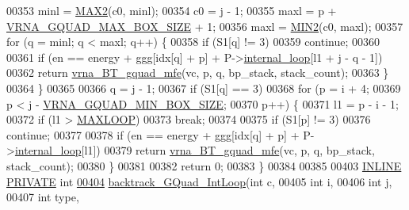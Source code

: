 \begin{DoxyCode}
00353     minl  = \mbox{\hyperlink{group__utils_ga33297b3679c713b0c4d897cd0fe3b122}{MAX2}}(c0, minl);
00354     c0    = j - 1;
00355     maxl  = p + \mbox{\hyperlink{group__energy__parameters_ga56cafabad2f8a7db83f2d5d3b0e8d313}{VRNA\_GQUAD\_MAX\_BOX\_SIZE}} + 1;
00356     maxl  = \mbox{\hyperlink{group__utils_gae0b9cd0ce090bd69b951aa73e8fa4f7d}{MIN2}}(c0, maxl);
00357     \textcolor{keywordflow}{for} (q = minl; q < maxl; q++) \{
00358       \textcolor{keywordflow}{if} (S1[q] != 3)
00359         \textcolor{keywordflow}{continue};
00360 
00361       \textcolor{keywordflow}{if} (en == energy + ggg[idx[q] + p] + P->\mbox{\hyperlink{group__energy__parameters_a2a4fb2c65023ec371c9b96573da6d2fc}{internal\_loop}}[l1 + j - q - 1])
00362         \textcolor{keywordflow}{return} \mbox{\hyperlink{group__gquads_gad10fb8ad7ce3ba46d7d53ca7fefbcd80}{vrna\_BT\_gquad\_mfe}}(vc, p, q, bp\_stack, stack\_count);
00363     \}
00364   \}
00365 
00366   q = j - 1;
00367   \textcolor{keywordflow}{if} (S1[q] == 3)
00368     \textcolor{keywordflow}{for} (p = i + 4;
00369          p < j - \mbox{\hyperlink{group__energy__parameters_gad7bdd880afca461f97763d79ee57a347}{VRNA\_GQUAD\_MIN\_BOX\_SIZE}};
00370          p++) \{
00371       l1 = p - i - 1;
00372       \textcolor{keywordflow}{if} (l1 > \mbox{\hyperlink{energy__const_8h_ad1bd6eabac419670ddd3c9ed82145988}{MAXLOOP}})
00373         \textcolor{keywordflow}{break};
00374 
00375       \textcolor{keywordflow}{if} (S1[p] != 3)
00376         \textcolor{keywordflow}{continue};
00377 
00378       \textcolor{keywordflow}{if} (en == energy + ggg[idx[q] + p] + P->\mbox{\hyperlink{group__energy__parameters_a2a4fb2c65023ec371c9b96573da6d2fc}{internal\_loop}}[l1])
00379         \textcolor{keywordflow}{return} \mbox{\hyperlink{group__gquads_gad10fb8ad7ce3ba46d7d53ca7fefbcd80}{vrna\_BT\_gquad\_mfe}}(vc, p, q, bp\_stack, stack\_count);
00380     \}
00381 
00382   \textcolor{keywordflow}{return} 0;
00383 \}
00384 
00385 
00403 \mbox{\hyperlink{gquad_8h_a2eb6f9e0395b47b8d5e3eeae4fe0c116}{INLINE}} \mbox{\hyperlink{edit__cost_8h_a5e151c615eda34903514212f05a5ccf8}{PRIVATE}} \textcolor{keywordtype}{int}
\mbox{\hyperlink{group__gquads_ga220c41e8dbcee940ac975b8ce88e55c5}{00404}} \mbox{\hyperlink{group__gquads_ga220c41e8dbcee940ac975b8ce88e55c5}{backtrack\_GQuad\_IntLoop}}(\textcolor{keywordtype}{int}           c,
00405                         \textcolor{keywordtype}{int}           i,
00406                         \textcolor{keywordtype}{int}           j,
00407                         \textcolor{keywordtype}{int}           type,

\end{DoxyCode}

